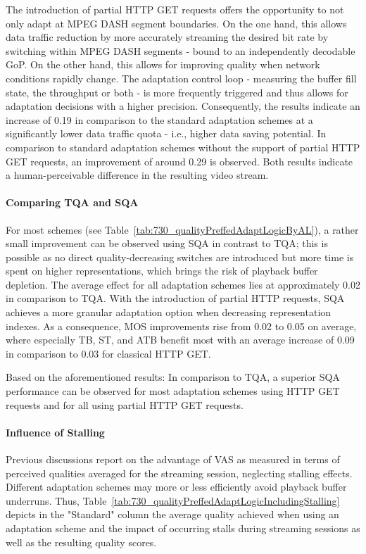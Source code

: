 The introduction of partial HTTP GET requests offers the opportunity to not only adapt at \ac{MPEG} \ac{DASH} segment boundaries.
On the one hand, this allows data traffic reduction by more accurately streaming the desired bit rate by switching within \ac{MPEG} \ac{DASH} segments - bound to an independently decodable \ac{GoP}. 
On the other hand, this allows for improving quality when network conditions rapidly change. 
The adaptation control loop - measuring the buffer fill state, the throughput or both - is more frequently triggered and thus allows for adaptation decisions with a higher precision.
Consequently, the results indicate an increase of 0.19 in comparison to the standard adaptation schemes at a significantly lower data traffic quota - i.e., higher data saving potential.
In comparison to standard adaptation schemes without the support of partial \ac{HTTP} GET requests, an improvement of around 0.29 is observed.
Both results indicate a human-perceivable difference in the resulting video stream.
\paragraph{Comparing TQA and SQA}
For most schemes (see Table~\ref{tab:730_qualityPreffedAdaptLogicByAL}), a rather small improvement can be observed using \ac{SQA} in contrast to \ac{TQA}; this is possible as no direct quality-decreasing switches are introduced but more time is spent on higher representations, which brings the risk of playback buffer depletion.
The average effect for all adaptation schemes lies at approximately 0.02 in comparison to \ac{TQA}.
With the introduction of partial \ac{HTTP} requests, \ac{SQA} achieves a more granular adaptation option when decreasing representation indexes.
As a consequence, \ac{MOS} improvements rise from 0.02 to 0.05 on average, where  especially \ac{TB}, \ac{ST}, and \ac{ATB} benefit most with an average increase of 0.09 in comparison to 0.03 for classical \ac{HTTP} GET.

Based on the aforementioned results: In comparison to \ac{TQA}, a superior \ac{SQA} performance can be observed for most adaptation schemes using HTTP GET requests and for all using partial HTTP GET requests.
\paragraph{Influence of Stalling}
\label{sec:730_eval_stralling}
Previous discussions report on the advantage of \ac{VAS} as measured in terms of perceived qualities averaged for the streaming session, neglecting stalling effects.
Different adaptation schemes may more or less efficiently avoid playback buffer underruns. 
Thus, Table~\ref{tab:730_qualityPreffedAdaptLogicIncludingStalling} depicts in the "Standard" column the average quality achieved when using an adaptation scheme and the impact of occurring stalls during streaming sessions as well as the resulting quality scores.

